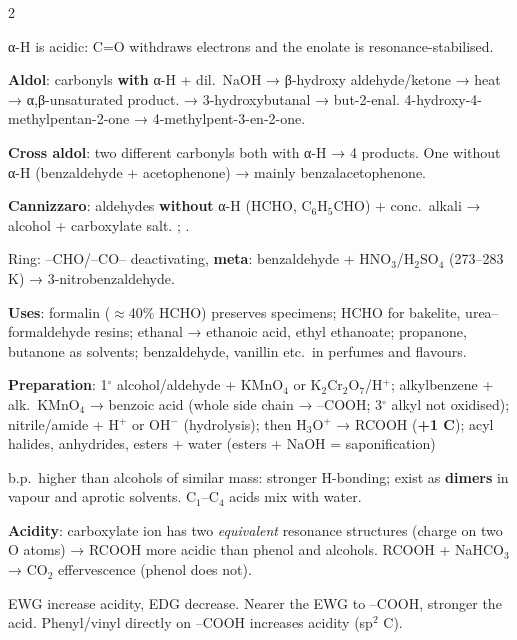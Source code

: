 \documentclass[9pt,a4paper]{extarticle}
\newcommand{\nr}[1]{\textbf{\color{uc!85!black}#1}}
\begin{document}
\begin{multicols}{2}
\begin{fl}
\end{fl}
\begin{fl}
\item α-H is acidic: C=O withdraws electrons and the enolate is resonance-stabilised.
\item \nr{Aldol}: carbonyls \textbf{with} α-H + dil.\ NaOH → β-hydroxy aldehyde/ketone → heat → α,β-unsaturated product.  → 3-hydroxybutanal → but-2-enal.  4-hydroxy-4-methylpentan-2-one → 4-methylpent-3-en-2-one.
\item \textbf{Cross aldol}: two different carbonyls both with α-H → 4 products. One without α-H (benzaldehyde + acetophenone) → mainly benzalacetophenone.
\item \nr{Cannizzaro}: aldehydes \textbf{without} α-H (HCHO, C$_6$H$_5$CHO) + conc.\ alkali → alcohol + carboxylate salt. ; .
\item Ring: --CHO/--CO-- deactivating, \textbf{meta}: benzaldehyde + HNO$_3$/H$_2$SO$_4$ (273--283 K) → 3-nitrobenzaldehyde.
\item \textbf{Uses}: formalin ($\approx$40\% HCHO) preserves specimens; HCHO for bakelite, urea--formaldehyde resins; ethanal → ethanoic acid, ethyl ethanoate; propanone, butanone as solvents; benzaldehyde, vanillin etc.\ in perfumes and flavours.
\end{fl}
\begin{kbox}
\textbf{Preparation}: 1$^\circ$ alcohol/aldehyde + KMnO$_4$ or K$_2$Cr$_2$O$_7$/H$^+$; alkylbenzene + alk.\ KMnO$_4$ → benzoic acid (whole side chain → --COOH; 3$^\circ$ alkyl not oxidised);\\
nitrile/amide + H$^+$ or OH$^-$ (hydrolysis);  then H$_3$O$^+$ → RCOOH (\textbf{+1 C}); acyl halides, anhydrides, esters + water (esters + NaOH = saponification)
\end{kbox}
\begin{fl}
\item b.p.\ higher than alcohols of similar mass: stronger H-bonding; exist as \textbf{dimers} in vapour and aprotic solvents. C$_1$--C$_4$ acids mix with water.
\item \textbf{Acidity}: carboxylate ion has two \emph{equivalent} resonance structures (charge on two O atoms) → RCOOH more acidic than phenol and alcohols. RCOOH + NaHCO$_3$ → CO$_2$ effervescence (phenol does not).
\item EWG increase acidity, EDG decrease. Nearer the EWG to --COOH, stronger the acid. Phenyl/vinyl directly on --COOH increases acidity (sp$^2$ C).

\end{fl}
\end{multicols}
\end{document}
